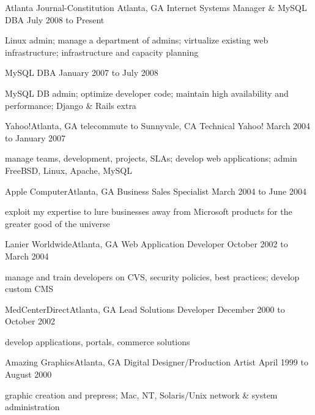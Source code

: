 \documentclass[10pt]{article}
\begin{document}


\sectionheader
{Atlanta Journal-Constitution}
{Atlanta, GA}
{Internet Systems Manager \& MySQL DBA}
{July 2008 to Present}
\begin{longtext}
Linux admin;
manage a department of admins;
virtualize existing web infrastructure;
infrastructure and capacity planning
\end{longtext}
\sectionsub
{MySQL DBA}
{January 2007 to July 2008}
\begin{longtext}
MySQL DB admin;
optimize developer code;
maintain high availability and performance;
Django \& Rails extra
\end{longtext}

\sectionheader
{Yahoo!}{Atlanta, GA telecommute to Sunnyvale, CA}
{Technical Yahoo!}
{March 2004 to January 2007}
\begin{longtext}
manage teams, development, projects, SLAs;
develop web applications;
admin FreeBSD, Linux, Apache, MySQL
\end{longtext}

\sectionheader
{Apple Computer}{Atlanta, GA}
{Business Sales Specialist}
{March 2004 to June 2004}
\begin{longtext}
exploit my expertise to lure businesses away from Microsoft products for the greater good of the universe
\end{longtext}

\sectionheader
{Lanier Worldwide}{Atlanta, GA}
{Web Application Developer}
{October 2002 to March 2004}
\begin{longtext}
manage and train developers on CVS, security policies, best practices;
develop custom CMS
\end{longtext}

\sectionheader
{MedCenterDirect}{Atlanta, GA}
{Lead Solutions Developer}
{December 2000 to October 2002}
\begin{longtext}
develop applications, portals, commerce solutions
\end{longtext}

\sectionheader
{Amazing Graphics}{Atlanta, GA}
{Digital Designer/Production Artist}
{April 1999 to August 2000}
\begin{longtext}
graphic creation and prepress;
Mac, NT, Solaris/Unix network \& system administration
\end{longtext}
\end{document}
